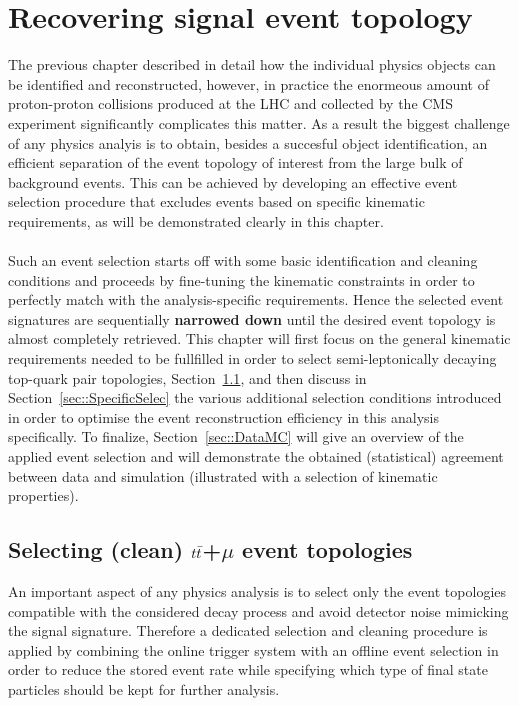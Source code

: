 \chapter{Recovering signal event topology} \label{chp:labelTitle}

The previous chapter described in detail how the individual physics objects can be identified and reconstructed, however, in practice the enormeous amount of proton-proton collisions produced at the LHC and collected by the CMS experiment significantly complicates this matter.
As a result the biggest challenge of any physics analyis is to obtain, besides a succesful object identification, an efficient separation of the event topology of interest from the large bulk of background events.
This can be achieved by developing an effective event selection procedure that excludes events based on specific kinematic requirements, as will be demonstrated clearly in this chapter.
\\
\\
Such an event selection starts off with some basic identification and cleaning conditions and proceeds by fine-tuning the kinematic constraints in order to perfectly match with the analysis-specific requirements. Hence the selected event signatures are sequentially \textbf{narrowed down} until the desired event topology is almost completely retrieved. This chapter will first focus on the general kinematic requirements needed to be fullfilled in order to select semi-leptonically decaying top-quark pair topologies, Section~\ref{sec::MainSelec}, and then discuss in Section~\ref{sec::SpecificSelec} the various additional selection conditions introduced in order to optimise the event reconstruction efficiency in this analysis specifically.
To finalize, Section~\ref{sec::DataMC} will give an overview of the applied event selection and will demonstrate the obtained (statistical) agreement between data and simulation (illustrated with a selection of kinematic properties).

\section{Selecting (clean) $t\bar{t}$+$\mu$ event topologies}\label{sec::MainSelec}
An important aspect of any physics analysis is to select only the event topologies compatible with the considered decay process and avoid detector noise mimicking the signal signature. 
Therefore a dedicated selection and cleaning procedure is applied by combining the online trigger system with an offline event selection in order to reduce the stored event rate while specifying which type of final state particles should be kept for further analysis.

